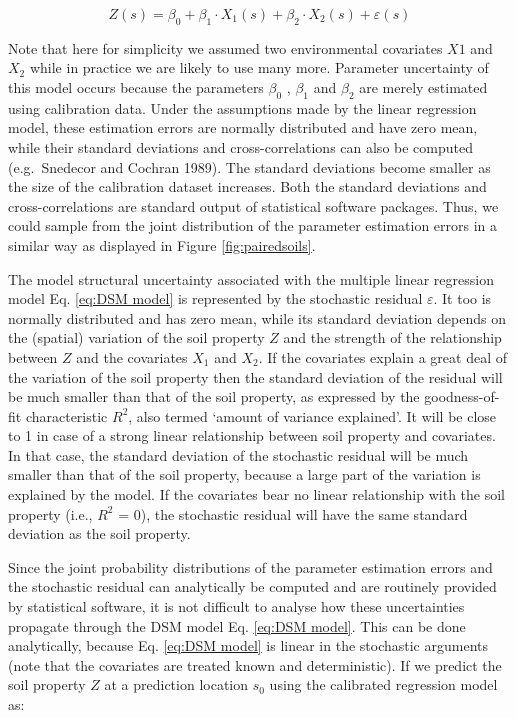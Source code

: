 \documentclass[10pt,b5paper,]{book}
\theoremstyle{definition}
\theoremstyle{definition}
\theoremstyle{definition}
\theoremstyle{remark}
\begin{document}
\begin{equation}
\label{eq:DSM model}
Z(s) = \beta_0 + \beta_1  \cdot X_1 (s) + \beta_2 \cdot X_2 (s) + \varepsilon(s)
\end{equation}

Note that here for simplicity we assumed two environmental covariates
\({X1}\) and \({X_2}\) while in practice we are likely to use many more.
Parameter uncertainty of this model occurs because the parameters
\({\beta_0}\) , \({\beta_1}\) and \({\beta_2}\) are merely estimated
using calibration data. Under the assumptions made by the linear
regression model, these estimation errors are normally distributed and
have zero mean, while their standard deviations and cross-correlations
can also be computed (e.g.~Snedecor and Cochran 1989). The standard
deviations become smaller as the size of the calibration dataset
increases. Both the standard deviations and cross-correlations are
standard output of statistical software packages. Thus, we could sample
from the joint distribution of the parameter estimation errors in a
similar way as displayed in Figure \ref{fig:pairedsoils}.

The model structural uncertainty associated with the multiple linear
regression model Eq. \ref{eq:DSM model} is represented by the stochastic
residual \({\varepsilon}\). It too is normally distributed and has zero
mean, while its standard deviation depends on the (spatial) variation of
the soil property \(Z\) and the strength of the relationship between
\(Z\) and the covariates \({X_1}\) and \({X_2}\). If the covariates
explain a great deal of the variation of the soil property then the
standard deviation of the residual will be much smaller than that of the
soil property, as expressed by the goodness-of-fit characteristic
\({R^2}\), also termed `amount of variance explained'. It will be close
to 1 in case of a strong linear relationship between soil property and
covariates. In that case, the standard deviation of the stochastic
residual will be much smaller than that of the soil property, because a
large part of the variation is explained by the model. If the covariates
bear no linear relationship with the soil property (i.e., \({R^2}\) =
0), the stochastic residual will have the same standard deviation as the
soil property.

Since the joint probability distributions of the parameter estimation
errors and the stochastic residual can analytically be computed and are
routinely provided by statistical software, it is not difficult to
analyse how these uncertainties propagate through the DSM model Eq.
\ref{eq:DSM model}. This can be done analytically, because Eq.
\ref{eq:DSM model} is linear in the stochastic arguments (note that the
covariates are treated known and deterministic). If we predict the soil
property \(Z\) at a prediction location \({s_0}\) using the calibrated
regression model as:
\end{document}

